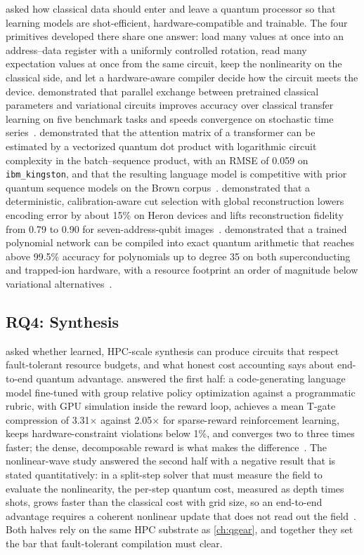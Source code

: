  asked how classical data should enter and leave a quantum processor so that learning models are shot-efficient, hardware-compatible and trainable. The four primitives developed there share one answer: load many values at once into an address--data register with a uniformly controlled rotation, read many expectation values at once from the same circuit, keep the nonlinearity on the classical side, and let a hardware-aware compiler decide how the circuit meets the device. \qpie{} demonstrated that parallel exchange between pretrained classical parameters and variational circuits improves accuracy over classical transfer learning on five benchmark tasks and speeds convergence on stochastic time series~\cite{guo2025qpie}. \vqt{} demonstrated that the attention matrix of a transformer can be estimated by a vectorized quantum dot product with logarithmic circuit complexity in the batch--sequence product, with an RMSE of 0.059 on \texttt{ibm\_kingston}, and that the resulting language model is competitive with prior quantum sequence models on the Brown corpus~\cite{guo2025vqt}. \shardq{} demonstrated that a deterministic, calibration-aware cut selection with global reconstruction lowers encoding error by about 15\% on Heron devices and lifts reconstruction fidelity from 0.79 to 0.90 for seven-address-qubit images~\cite{guo2025shardq}. \nnqa{} demonstrated that a trained polynomial network can be compiled into exact quantum arithmetic that reaches above 99.5\% accuracy for polynomials up to degree 35 on both superconducting and trapped-ion hardware, with a resource footprint an order of magnitude below variational alternatives~\cite{guo2026nnqa}.

\subsection{RQ4: Synthesis}\label{sec:conclusion:rq4}

 asked whether learned, HPC-scale synthesis can produce circuits that respect fault-tolerant resource budgets, and what honest cost accounting says about end-to-end quantum advantage. \rubriq{} answered the first half: a code-generating language model fine-tuned with group relative policy optimization against a programmatic rubric, with GPU simulation inside the reward loop, achieves a mean T-gate compression of 3.31$\times$ against 2.05$\times$ for sparse-reward reinforcement learning, keeps hardware-constraint violations below 1\%, and converges two to three times faster; the dense, decomposable reward is what makes the difference~\cite{guo2026rubriq}. The nonlinear-wave study answered the second half with a negative result that is stated quantitatively: in a split-step solver that must measure the field to evaluate the nonlinearity, the per-step quantum cost, measured as depth times shots, grows faster than the classical cost with grid size, so an end-to-end advantage requires a coherent nonlinear update that does not read out the field~\cite{guo2026nonlinearwaves}. Both halves rely on the same HPC substrate as \cref{ch:qgear}, and together they set the bar that fault-tolerant compilation must clear.

